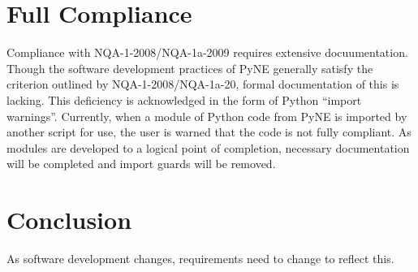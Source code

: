 \documentclass{anstrans}
\begin{document}
\section{Full Compliance}

Compliance with NQA-1-2008/NQA-1a-2009 requires extensive docuumentation.
Though the software development practices of PyNE generally satisfy the
criterion outlined by NQA-1-2008/NQA-1a-20, formal documentation of this is
lacking. This deficiency is acknowledged in the form of Python ``import
warnings''. Currently, when a module of Python code from PyNE is imported by
another script for use, the user is warned that the code is not fully
compliant. As modules are developed to a logical point of completion, necessary
documentation will be completed and import guards will be removed.

\section{Conclusion}



As software development changes, requirements need to change to reflect this.





\end{document}
